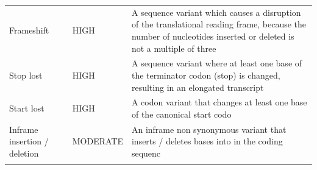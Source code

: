 \documentclass[12pt,twoside]{reedthesis}
\theoremstyle{definition}
\theoremstyle{definition}
\theoremstyle{remark}
\begin{document}
\begin{longtable}[]{@{}lll@{}}
  \begin{minipage}[t]{0.18\columnwidth}\raggedright\strut
  Frameshift\strut
  \end{minipage} & \begin{minipage}[t]{0.11\columnwidth}\raggedright\strut
  HIGH\strut
  \end{minipage} & \begin{minipage}[t]{0.63\columnwidth}\raggedright\strut
  A sequence variant which causes a disruption of the translational
  reading frame, because the number of nucleotides inserted or deleted is
  not a multiple of three\strut
  \end{minipage}\tabularnewline
  \begin{minipage}[t]{0.18\columnwidth}\raggedright\strut
  Stop lost\strut
  \end{minipage} & \begin{minipage}[t]{0.11\columnwidth}\raggedright\strut
  HIGH\strut
  \end{minipage} & \begin{minipage}[t]{0.63\columnwidth}\raggedright\strut
  A sequence variant where at least one base of the terminator codon
  (stop) is changed, resulting in an elongated transcript\strut
  \end{minipage}\tabularnewline
  \begin{minipage}[t]{0.18\columnwidth}\raggedright\strut
  Start lost\strut
  \end{minipage} & \begin{minipage}[t]{0.11\columnwidth}\raggedright\strut
  HIGH\strut
  \end{minipage} & \begin{minipage}[t]{0.63\columnwidth}\raggedright\strut
  A codon variant that changes at least one base of the canonical start
  codo\strut
  \end{minipage}\tabularnewline
  \begin{minipage}[t]{0.18\columnwidth}\raggedright\strut
  Inframe insertion / deletion\strut
  \end{minipage} & \begin{minipage}[t]{0.11\columnwidth}\raggedright\strut
  MODERATE\strut
  \end{minipage} & \begin{minipage}[t]{0.63\columnwidth}\raggedright\strut
  An inframe non synonymous variant that inserts / deletes bases into in
  the coding sequenc\strut
  \end{minipage}\tabularnewline
  \begin{minipage}[t]{0.18\columnwidth}\raggedright\strut

\end{minipage}
\end{longtable}
\end{document}
